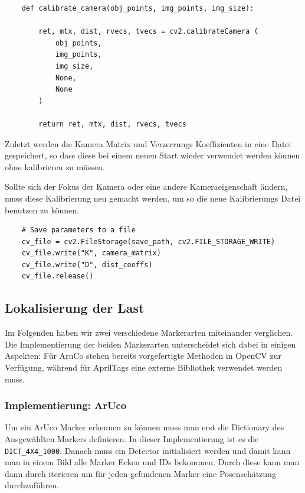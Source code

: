 \begin{lstlisting}
    def calibrate_camera(obj_points, img_points, img_size):

        ret, mtx, dist, rvecs, tvecs = cv2.calibrateCamera (
            obj_points, 
            img_points, 
            img_size, 
            None, 
            None
        )

        return ret, mtx, dist, rvecs, tvecs
\end{lstlisting}


Zuletzt werden die Kamera Matrix und Verzerrungs Koeffizienten in eine Datei gespeichert, so dass 
diese bei einem neuen Start wieder verwendet werden können ohne kalibrieren zu müssen.

Sollte sich der Fokus der Kamera oder eine andere Kameraeigenschaft ändern,
muss diese Kalibrierung neu gemacht werden, um so die neue Kalibrierungs Datei benutzen zu können.


\begin{lstlisting}
    # Save parameters to a file
    cv_file = cv2.FileStorage(save_path, cv2.FILE_STORAGE_WRITE)
    cv_file.write("K", camera_matrix)
    cv_file.write("D", dist_coeffs)
    cv_file.release()
\end{lstlisting}

\clearpage

\subsection{Lokalisierung der Last}
Im Folgenden haben wir zwei verschiedene Markerarten miteinander verglichen. Die Implementierung der beiden Markerarten
unterscheidet sich dabei in einigen Aspekten: Für AruCo stehen bereits vorgefertigte Methoden in OpenCV zur Verfügung, 
während für AprilTags eine externe Bibliothek verwendet werden muss.

\subsubsection{Implementierung: ArUco}

Um ein ArUco Marker erkennen zu können muss man erst die Dictionary des Ausgewählten Markers definieren. 
In dieser Implementierung ist es die \texttt{DICT\_4X4\_1000}.
Danach muss ein Detector initialisiert werden und damit kann man in einem Bild alle Marker Ecken und IDs bekommen.
Durch diese kann man dann durch iterieren um für jeden gefundenen Marker eine Posenschätzung durchzuführen.


